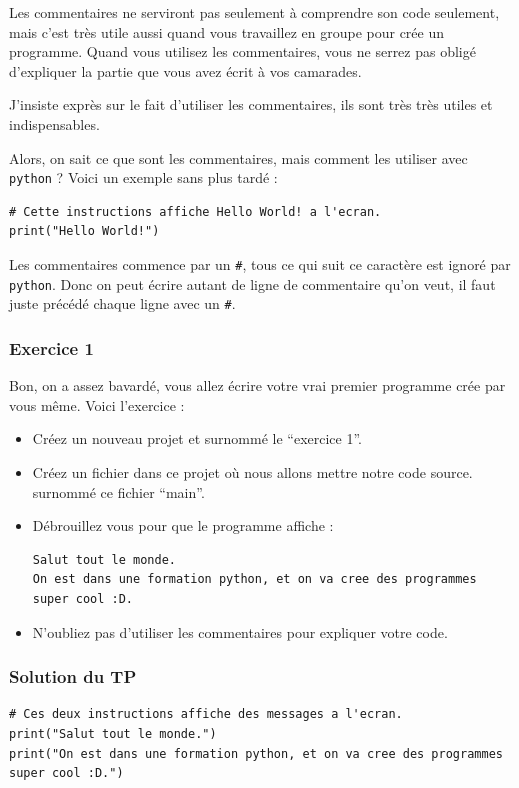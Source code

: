 \documentclass[12pt]{article}
\newcommand{\code}[1]{\colorbox{light-gray}{\texttt{#1}}}
\begin{document}
            Les commentaires ne serviront pas seulement à comprendre son code seulement, mais c'est très utile aussi
            quand vous travaillez en groupe pour crée un programme. Quand vous utilisez les commentaires, vous ne serrez
            pas obligé d'expliquer la partie que vous avez écrit à vos camarades.
            
            J'insiste exprès sur le fait d'utiliser les commentaires, ils sont très très utiles et indispensables.

            Alors, on sait ce que sont les commentaires, mais comment les utiliser avec \code{python} ? Voici 
            un exemple sans plus tardé :
            \begin{lstlisting}[style=code]
# Cette instructions affiche Hello World! a l'ecran.
print("Hello World!") 
            \end{lstlisting}

            Les commentaires commence par un \code{\#}, tous ce qui suit ce caractère est ignoré par \code{python}.
            Donc on peut écrire autant de ligne de commentaire qu'on veut, il faut juste précédé chaque ligne avec un
            \code{\#}.

        \subsubsection{Exercice 1}
            Bon, on a assez bavardé, vous allez écrire votre vrai premier programme crée par vous même.
            Voici l'exercice :
            \begin{itemize}
                \item Créez un nouveau projet et surnommé le ``exercice 1''.
                \item Créez un fichier dans ce projet où nous allons mettre notre code source. surnommé ce fichier
                    ``main''.
                \item Débrouillez vous pour que le programme affiche :
                    \begin{lstlisting}[style=exec_result, breaklines=false]
Salut tout le monde.
On est dans une formation python, et on va cree des programmes super cool :D.
                    \end{lstlisting}
                \item N'oubliez pas d'utiliser les commentaires pour expliquer votre code.
            \end{itemize}

        \subsubsection{Solution du TP}
            \begin{lstlisting}[style=code, breaklines=false]
# Ces deux instructions affiche des messages a l'ecran.
print("Salut tout le monde.")
print("On est dans une formation python, et on va cree des programmes super cool :D.")
            \end{lstlisting}
\end{document}
